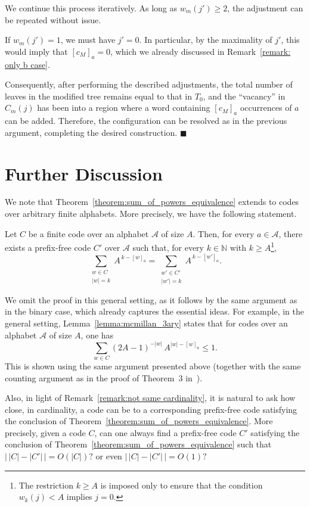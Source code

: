 \documentclass[a4,12pt]{article}%
\begin{document}
We continue this process iteratively. As long as $w_m(j') \ge 2$, the adjustment can be repeated without issue.  

If $w_m(j') = 1$, we must have $j' = 0$. In particular, by the maximality of $j'$, this would imply that $[c_M]_a=0$, which we already discussed in Remark~\ref{remark: only b case}.  

Consequently, after performing the described adjustments, the total number of leaves in the modified tree remains equal to that in $T_0$, and the “vacancy” in $C_m(j)$ has been  into a region where a word containing $[c_M]_a$ occurrences of $a$ can be added. Therefore, the configuration can be resolved as in the previous argument, completing the desired construction. 
$\blacksquare$

\section{Further Discussion}
We note that Theorem~\ref{theorem:sum_of_powers_equivalence} extends to codes over arbitrary finite alphabets. More precisely, we have the following statement.

\medskip
Let $C$ be a finite code over an alphabet $\mathcal{A}$ of size $A$. Then, for every $a \in \mathcal{A}$, there exists a prefix-free code $C'$ over $\mathcal{A}$ such that, for every $k \in \mathbb{N}$ with $k \ge A$\footnote{The restriction $k \ge A$ is imposed only to ensure that the condition $w_k(j) < A$ implies $j = 0$.},
\[
\sum_{\substack{w \in C \\ \lvert w \rvert = k}} A^{\,k - [w]_a}
=
\sum_{\substack{w' \in C' \\ \lvert w' \rvert = k}} A^{\,k - [w']_a}.
\]

We omit the proof in this general setting, as it follows by the same argument as in the binary case, which already captures the essential ideas. For example, in the general setting, Lemma~\ref{lemma:mcmillan_3ary} states that for codes over an alphabet $\mathcal{A}$ of size $A$, one has
\[
\sum_{w \in C} (2A - 1)^{-\lvert w \rvert} \, A^{\lvert w \rvert - [w]_a} \le 1.
\]
This is shown using the same argument presented above (together with the same counting argument as in the proof of Theorem~3 in~\cite{PrefixCodesandFreeGroups}).

\medskip

Also, in light of Remark~\ref{remark:not same cardinality}, it is natural to ask how close, in cardinality, a code can be to a corresponding prefix-free code satisfying the conclusion of Theorem~\ref{theorem:sum_of_powers_equivalence}. More precisely, given a code $C$, can one always find a prefix-free code $C'$ satisfying the conclusion of Theorem~\ref{theorem:sum_of_powers_equivalence} such that $\bigl|\, \lvert C \rvert - \lvert C' \rvert \,\bigr| = O(\lvert C \rvert)? $ or even $\bigl|\, \lvert C \rvert - \lvert C' \rvert \,\bigr| =O(1)?$
\end{document}
